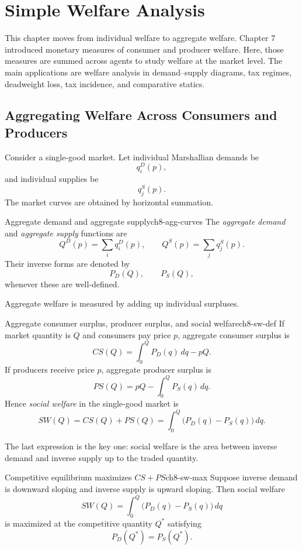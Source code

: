 
\section{Simple Welfare Analysis}

This chapter moves from individual welfare to aggregate welfare. Chapter 7 introduced monetary measures of consumer and producer welfare. Here, those measures are summed across agents to study welfare at the market level. The main applications are welfare analysis in demand--supply diagrams, tax regimes, deadweight loss, tax incidence, and comparative statics.

\subsection{Aggregating Welfare Across Consumers and Producers}

Consider a single-good market. Let individual Marshallian demands be
\[
q_i^D(p),
\]
and individual supplies be
\[
q_j^S(p).
\]
The market curves are obtained by horizontal summation.

\begin{definition}{Aggregate demand and aggregate supply}{ch8-agg-curves}
The \emph{aggregate demand} and \emph{aggregate supply} functions are
\[
Q^D(p)=\sum_i q_i^D(p),
\qquad
Q^S(p)=\sum_j q_j^S(p).
\]
Their inverse forms are denoted by
\[
P_D(Q), \qquad P_S(Q),
\]
whenever these are well-defined.
\end{definition}

Aggregate welfare is measured by adding up individual surpluses.

\begin{definition}{Aggregate consumer surplus, producer surplus, and social welfare}{ch8-sw-def}
If market quantity is $Q$ and consumers pay price $p$, aggregate consumer surplus is
\[
CS(Q)=\int_0^Q P_D(q)\,dq - pQ.
\]
If producers receive price $p$, aggregate producer surplus is
\[
PS(Q)=pQ-\int_0^Q P_S(q)\,dq.
\]
Hence \emph{social welfare} in the single-good market is
\[
SW(Q)=CS(Q)+PS(Q)
=
\int_0^Q \bigl(P_D(q)-P_S(q)\bigr)\,dq.
\]
\end{definition}

The last expression is the key one: social welfare is the area between inverse demand and inverse supply up to the traded quantity.

\begin{theorem}{Competitive equilibrium maximizes $CS+PS$}{ch8-sw-max}
Suppose inverse demand is downward sloping and inverse supply is upward sloping. Then social welfare
\[
SW(Q)=\int_0^Q \bigl(P_D(q)-P_S(q)\bigr)\,dq
\]
is maximized at the competitive quantity $Q^*$ satisfying
\[
P_D(Q^*)=P_S(Q^*).
\]
\end{theorem}

